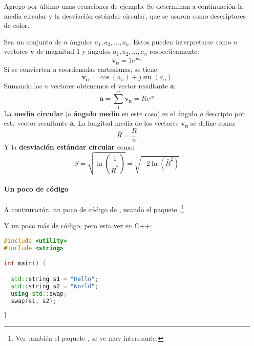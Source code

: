 \pagebreak

Agrego por último unas ecuaciones de ejemplo. Se determinan a continuación la media circular y la desviación estándar circular, que se usaron como descriptores de color.~\autocite{estcirc}

Sea un conjunto de $ n $ ángulos $ a_1, a_2, \dots, a_n $. Estos pueden interpretarse como $ n $ vectores $ \bm{v} $ de magnitud $ 1 $ y ángulos $ a_1, a_2, \dots, a_n $ respectivamente:
%
\begin{equation} \bm{v_n} = 1 e^{j a_n} \end{equation}
%
Si se convierten a coordenadas cartesianas, se tiene:
%
\begin{equation} \bm{v_n} = \cos(a_n) + j \sin(a_n) \end{equation}
%
Sumando los $ n $ vectores obtenemos el vector resultante $ \bm{a} $:
%
\begin{equation} \bm{a} = \sum_{1}^{n} \bm{v_n} = R e^{j \rho} \end{equation}
%
La \textbf{media circular} (o \textbf{ángulo medio} en este caso) es el ángulo $ \rho $ descripto por este vector resultante $ \bm{a} $.
%
La longitud media de los vectores $ \bm{v_n} $ se define como:
%
\begin{equation} \bar{R} = \frac{R}{n} \end{equation}
%
Y la \textbf{desviación estándar circular} como:
%
\begin{equation} S = \sqrt{\ln\left(\frac{1}{\bar{R}^2}\right)} = \sqrt{-2 \ln \left( \bar{R}^2 \right) } \end{equation}


\paragraph{Un poco de código}

A continuación, un poco de código de , usando el paquete .\footnote{Ver también el paquete , se ve muy interesante.}






Y un poco más de código, pero esta vez en C++:
% 
\begin{lstlisting}[language=c++, caption = {Swap values (https://cpppatterns.com/patterns/swap-values.html)}, title=Swap values]
#include <utility>
#include <string>

int main() {

  std::string s1 = "Hello";
  std::string s2 = "World";
  using std::swap;
  swap(s1, s2);
  
}
\end{lstlisting}